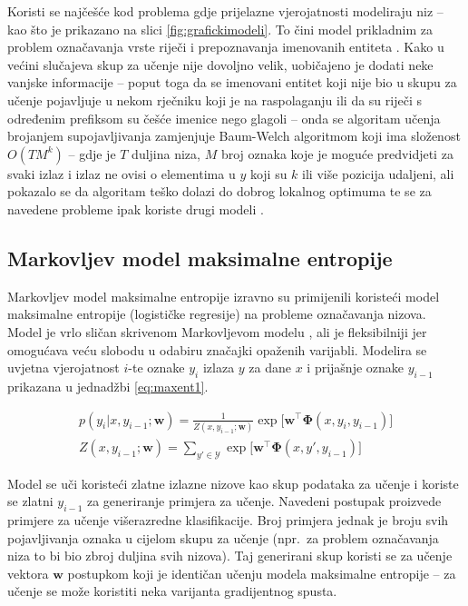Koristi se najčešće kod problema gdje prijelazne vjerojatnosti modeliraju niz --
kao što je prikazano na slici \ref{fig:grafickimodeli}. To čini model prikladnim
za problem označavanja vrste riječi \citep{halacsy2007hunpos} i prepoznavanja
imenovanih entiteta \citep{zhou2002named}. Kako u većini slučajeva skup za
učenje nije dovoljno velik, uobičajeno je dodati neke vanjske informacije --
poput toga da se imenovani entitet koji nije bio u skupu za učenje pojavljuje u
nekom rječniku koji je na raspolaganju ili da su riječi s određenim prefiksom su
češće imenice nego glagoli -- onda se algoritam učenja brojanjem supojavljivanja
zamjenjuje Baum-Welch algoritmom koji ima složenost $O(T M^k)$ -- gdje je $T$
duljina niza, $M$ broj oznaka koje je moguće predvidjeti za svaki izlaz i izlaz ne
ovisi o elementima u $y$ koji su $k$ ili više pozicija udaljeni, ali pokazalo se
da algoritam teško dolazi do dobrog lokalnog optimuma te se za navedene
probleme ipak koriste drugi modeli \citep{johnson2007doesn}.

\subsection{Markovljev model maksimalne entropije}

Markovljev model maksimalne entropije 
izravno su primijenili \citet*{mccallum2000maximum} koristeći model maksimalne
entropije (logističke regresije) na probleme označavanja nizova. Model je vrlo
sličan skrivenom Markovljevom modelu , ali je
fleksibilniji jer omogućava veću slobodu u odabiru značajki opaženih varijabli.
Modelira se uvjetna vjerojatnost $i$-te oznake $y_i$ izlaza $y$ za dane $x$ i
prijašnje oznake $y_{i-1}$ prikazana u jednadžbi \ref{eq:maxent1}.

\begin{equation}\label{eq:maxent1}
\begin{aligned}
  p(y_i | x, y_{i-1}; \mathbf{w}) = \frac{1}{Z(x, y_{i-1}; \mathbf{w})} \exp \big[ \mathbf{w}^\top \mathbf{\Phi}(x, y_i, y_{i-1})\big] \\
  Z(x, y_{i-1}; \mathbf{w}) = \sum_{y' \in \mathcal{Y}} \exp \big[ \mathbf{w}^\top \mathbf{\Phi}(x, y', y_{i-1})\big]
\end{aligned}
\end{equation}

\noindent
Model se uči koristeći zlatne izlazne nizove kao skup podataka za učenje i
koriste se zlatni $y_{i-1}$ za generiranje primjera za učenje. Navedeni postupak
proizvede primjere za učenje višerazredne klasifikacije. Broj primjera jednak je
broju svih pojavljivanja oznaka u cijelom skupu za učenje (npr.~za problem
označavanja niza to bi bio zbroj duljina svih nizova). Taj generirani skup
koristi se za učenje vektora $\mathbf{w}$ postupkom koji je identičan učenju
modela maksimalne entropije -- za učenje se može koristiti neka varijanta
gradijentnog spusta.

